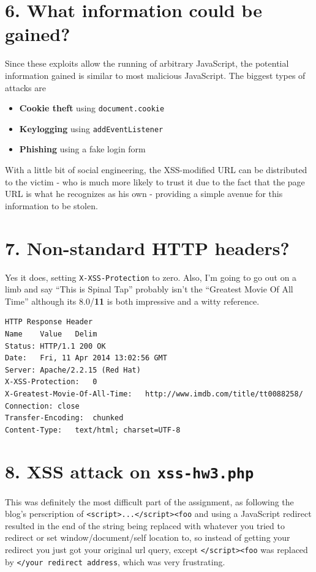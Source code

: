 \documentclass[12pt,letterpaper]{article}
\begin{document}
\section*{6. What information could be gained?}
Since these exploits allow the running of arbitrary JavaScript, the potential
information gained is similar to most malicious JavaScript. The biggest types
of attacks are
\begin{itemize}
\item \textbf{Cookie theft} using \verb~document.cookie~
\item \textbf{Keylogging} using \verb~addEventListener~
\item \textbf{Phishing} using a fake login form
\end{itemize}

With a little bit of social engineering, the XSS-modified URL can be distributed
to the victim - who is much more likely to trust it due to the fact that the
page URL is what he recognizes as his own - providing a simple avenue for
this information to be stolen.

\section*{7. Non-standard HTTP headers?}
Yes it does, setting \verb~X-XSS-Protection~ to zero. Also, I'm going to go
out on a limb and say ``This is Spinal Tap'' probably isn't the
``Greatest Movie Of All Time'' although its 8.0/\textbf{11} is both impressive
and a witty reference.

\begin{verbatim}
HTTP Response Header
Name	Value	Delim
Status: HTTP/1.1 200 OK
Date:	Fri, 11 Apr 2014 13:02:56 GMT	
Server:	Apache/2.2.15 (Red Hat)	
X-XSS-Protection:	0	
X-Greatest-Movie-Of-All-Time:	http://www.imdb.com/title/tt0088258/	
Connection:	close	
Transfer-Encoding:	chunked	
Content-Type:	text/html; charset=UTF-8
\end{verbatim}

\section*{8. XSS attack on \verb~xss-hw3.php~}
This was definitely the most difficult part of the assignment, as following
the blog's perscription of \verb~<script>...</script><foo~ and using a JavaScript
redirect resulted in the end of the string being replaced with
whatever you tried to redirect or set window/document/self location to,
so instead of getting your redirect you just got
your original url query, except \verb~</script><foo~ was replaced by 
\verb~</your redirect address~, which was very frustrating.
\end{document}
